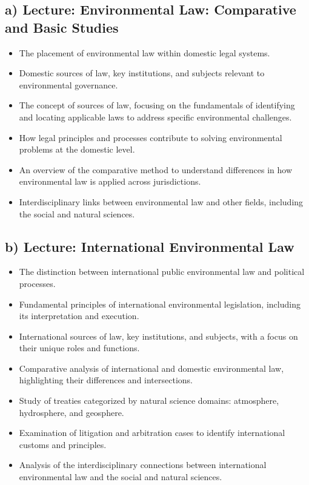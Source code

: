 \documentclass[
  letterpaper,
  10pt,
  openany]{book}
\providecommand{\tightlist}{%
  \setlength{\itemsep}{0pt}\setlength{\parskip}{0pt}}\usepackage{longtable,booktabs,array}
\begin{document}

\subsection*{a) Lecture: Environmental Law: Comparative and Basic
Studies}\label{a-lecture-environmental-law-comparative-and-basic-studies}

\begin{itemize}
\tightlist
\item
  The placement of environmental law within domestic legal systems.
\item
  Domestic sources of law, key institutions, and subjects relevant to
  environmental governance.
\item
  The concept of sources of law, focusing on the fundamentals of
  identifying and locating applicable laws to address specific
  environmental challenges.
\item
  How legal principles and processes contribute to solving environmental
  problems at the domestic level.
\item
  An overview of the comparative method to understand differences in how
  environmental law is applied across jurisdictions.
\item
  Interdisciplinary links between environmental law and other fields,
  including the social and natural sciences.
\end{itemize}

\subsection*{b) Lecture: International Environmental
Law}\label{b-lecture-international-environmental-law}

\begin{itemize}
\tightlist
\item
  The distinction between international public environmental law and
  political processes.
\item
  Fundamental principles of international environmental legislation,
  including its interpretation and execution.
\item
  International sources of law, key institutions, and subjects, with a
  focus on their unique roles and functions.
\item
  Comparative analysis of international and domestic environmental law,
  highlighting their differences and intersections.
\item
  Study of treaties categorized by natural science domains: atmosphere,
  hydrosphere, and geosphere.
\item
  Examination of litigation and arbitration cases to identify
  international customs and principles.
\item
  Analysis of the interdisciplinary connections between international
  environmental law and the social and natural sciences.
\end{itemize}
\end{document}
